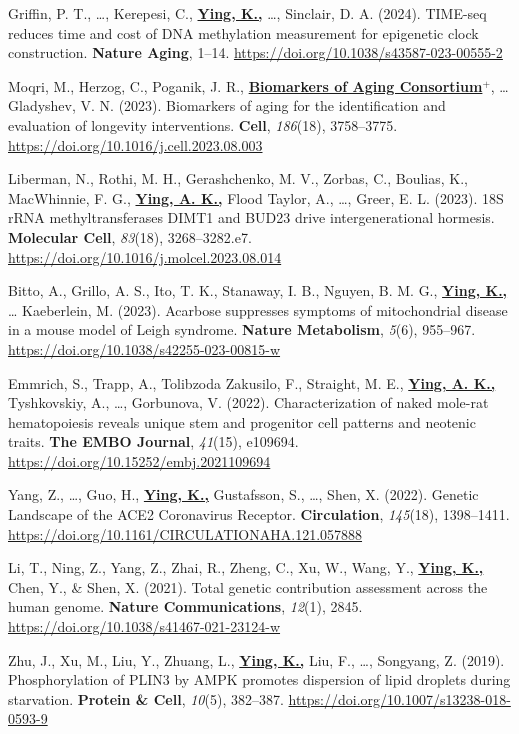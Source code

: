 \documentclass[
  11pt,
]
{article}
\begin{document}
Griffin, P. T., \ldots, Kerepesi, C., \textbf{\underline{Ying, K.,}}
\ldots, Sinclair, D. A. (2024). TIME-seq reduces time and cost of DNA
methylation measurement for epigenetic clock construction.
\textbf{Nature Aging}, 1--14.
\url{https://doi.org/10.1038/s43587-023-00555-2}

Moqri, M., Herzog, C., Poganik, J. R.,
\textbf{\underline{Biomarkers of Aging Consortium$^{+}$}}, \ldots{}
Gladyshev, V. N. (2023). Biomarkers of aging for the identification and
evaluation of longevity interventions. \textbf{Cell}, \emph{186}(18),
3758--3775. \url{https://doi.org/10.1016/j.cell.2023.08.003}

Liberman, N., Rothi, M. H., Gerashchenko, M. V., Zorbas, C., Boulias,
K., MacWhinnie, F. G., \textbf{\underline{Ying, A. K.,}} Flood Taylor,
A., \ldots, Greer, E. L. (2023). 18S rRNA methyltransferases DIMT1 and
BUD23 drive intergenerational hormesis. \textbf{Molecular Cell},
\emph{83}(18), 3268--3282.e7.
\url{https://doi.org/10.1016/j.molcel.2023.08.014}

Bitto, A., Grillo, A. S., Ito, T. K., Stanaway, I. B., Nguyen, B. M. G.,
\textbf{\underline{Ying, K.,}} \ldots{} Kaeberlein, M. (2023). Acarbose
suppresses symptoms of mitochondrial disease in a mouse model of Leigh
syndrome. \textbf{Nature Metabolism}, \emph{5}(6), 955--967.
\url{https://doi.org/10.1038/s42255-023-00815-w}

Emmrich, S., Trapp, A., Tolibzoda Zakusilo, F., Straight, M. E.,
\textbf{\underline{Ying, A. K.,}} Tyshkovskiy, A., \ldots, Gorbunova, V.
(2022). Characterization of naked mole-rat hematopoiesis reveals unique
stem and progenitor cell patterns and neotenic traits. \textbf{The EMBO
Journal}, \emph{41}(15), e109694.
\url{https://doi.org/10.15252/embj.2021109694}

Yang, Z., \ldots, Guo, H., \textbf{\underline{Ying, K.,}} Gustafsson,
S., \ldots, Shen, X. (2022). Genetic Landscape of the ACE2 Coronavirus
Receptor. \textbf{Circulation}, \emph{145}(18), 1398--1411.
\url{https://doi.org/10.1161/CIRCULATIONAHA.121.057888}

Li, T., Ning, Z., Yang, Z., Zhai, R., Zheng, C., Xu, W., Wang, Y.,
\textbf{\underline{Ying, K.,}} Chen, Y., \& Shen, X. (2021). Total
genetic contribution assessment across the human genome. \textbf{Nature
Communications}, \emph{12}(1), 2845.
\url{https://doi.org/10.1038/s41467-021-23124-w}

Zhu, J., Xu, M., Liu, Y., Zhuang, L., \textbf{\underline{Ying, K.,}}
Liu, F., \ldots, Songyang, Z. (2019). Phosphorylation of PLIN3 by AMPK
promotes dispersion of lipid droplets during starvation. \textbf{Protein
\& Cell}, \emph{10}(5), 382--387.
\url{https://doi.org/10.1007/s13238-018-0593-9}
\end{document}
